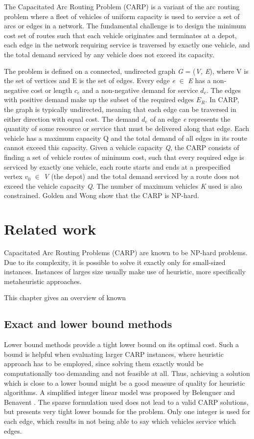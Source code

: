\documentclass[twoside]{ctuthesis}
\theoremstyle{plain}
\theoremstyle{definition}
\theoremstyle{note}
\begin{document}
The Capacitated Arc Routing Problem (CARP) is a variant of the arc routing problem where a fleet of vehicles of uniform capacity is used to service a set of arcs or edges in a network. The fundamental challenge is to design the minimum cost set of routes such that each vehicle originates and terminates at a depot, each edge in the network requiring service is traversed by exactly one vehicle, and the total demand serviced by any vehicle does not exceed its capacity.

The problem is defined on a connected, undirected graph \emph{G} = (\emph{V, E}), where V is the set of vertices and E is the set of edges. Every edge \emph{e} $\in$ \emph{E} has a non-negative cost or length \emph{$ c_e $} and a non-negative demand for service \emph{$ d_e $}. The edges with positive demand make up the subset of the required edges \emph{$ E_R $}. In CARP, the graph is typically undirected, meaning that each edge can be traversed in either direction with equal cost. 
The demand \emph{$ d_e $} of an edge \emph{e} represents the quantity of some resource or service that must be delivered along that edge. Each vehicle has a maximum capacity Q and the total demand of all edges in its route cannot exceed this capacity.
Given a vehicle capacity \emph{Q}, the CARP consists
of finding a set of vehicle routes of minimum cost,
such that every required edge is serviced by exactly
one vehicle, each route starts and ends at a prespecified vertex \emph{$ v_0 $} $\in$ \emph{V} (the depot) and the total
demand serviced by a route does not exceed the
vehicle capacity \emph{Q}. The number of maximum vehicles \emph{K} used is also constrained.  Golden and Wong \cite{golden1981capacitated} show that the CARP is NP-hard. 


\chapter{Related work}
Capacitated Arc Routing Problems (CARP) are known to be NP-hard problems. Due to its complexity, it is possible to solve it exactly only for small-sized instances. Instances of larges size usually make use of heuristic, more specifically metaheuristic approaches.

This chapter gives an overview of known 

\section{Exact and lower bound methods}
Lower bound methods provide a tight lower bound on its optimal cost. Such a bound is helpful when evaluating larger CARP instances, where heuristic approach has to be employed, since solving them exactly would be computationally too demanding and not feasible at all. Thus, achieving a solution which is close to a lower bound might be a good measure of quality for heuristic algorithms.
A simplified integer linear model was proposed by Belenguer and Benavent \cite{BELENGUER2003705}. The sparse formulation used does not lead to a valid CARP solutions, but presents very tight lower bounds for the problem. Only one integer is used for each edge, which results in not being able to say which vehicles service which edges.
\end{document}
